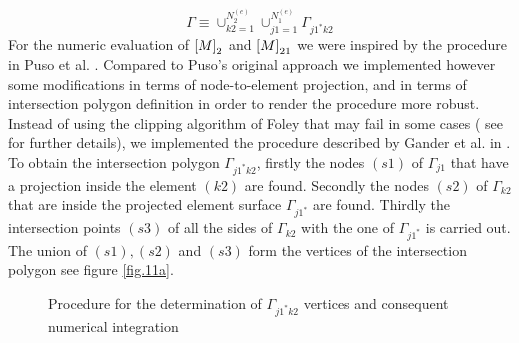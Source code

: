 \begin{equation}
\label{eq.52}
\Gamma\equiv\cup_{k2=1}^{N^{(e)}_2}\cup_{j1=1}^{N^{(e)}_1}\Gamma_{j1^*k2}
\end{equation}
 For the numeric evaluation of $\left[{M}\right]_2$ and $\left[{M}\right]_{21}$ we were inspired by the procedure in Puso et al. \cite{puso20043d}. Compared to Puso's original approach we implemented however some modifications in terms of node-to-element projection, and in terms of intersection polygon definition in order to render the procedure more robust. Instead of using the clipping algorithm of Foley \cite{foley1996computer} that may fail in some cases ( see \cite{gander2013algorithm} for further details), we implemented the procedure described by Gander et al. in \cite{gander2013algorithm}.
 To obtain the intersection polygon $\Gamma_{j1^*k2}$, firstly the nodes $(s1)$ of $\Gamma_{j1}$ that have a projection inside the element $(k2)$ are found.
Secondly the nodes $(s2)$ of $\Gamma_{k2}$ that are inside the projected element surface $\Gamma_{j1^*}$ are found.
Thirdly the intersection points $(s3)$ of all the sides of $\Gamma_{k2}$ with the one of $\Gamma_{j1^*}$ is carried out. The union of $(s1),(s2)$ and $(s3)$ form the vertices of the intersection polygon see figure \ref{fig.11a}.
\\
\begin{figure}[!ht]
     \caption{Procedure for the determination of  $\Gamma_{j1^*k2}$ vertices and consequent numerical integration }
     \label{fig.11}
   \end{figure}
